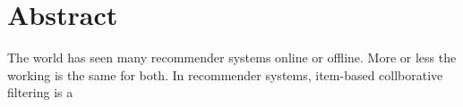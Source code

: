 \section*{Abstract}

The world has seen many recommender systems online or offline. More or less the working is the same for both. In recommender systems, item-based collborative filtering is a
    

